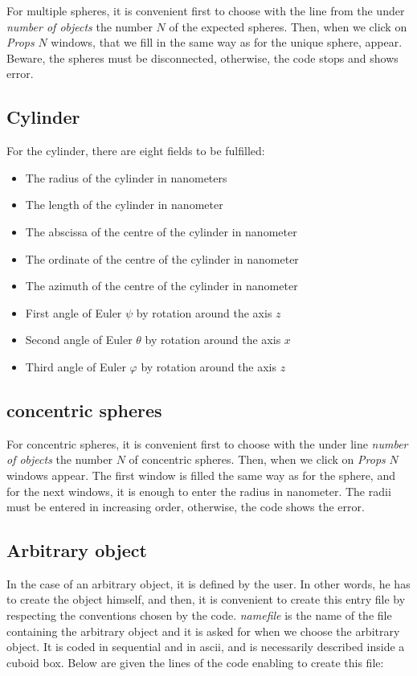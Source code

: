 For multiple spheres, it is convenient first to choose with the line 
from the under {\it number of objects} the number $N$ of the expected
spheres. Then, when we click on {\it Props} $N$ windows, that we fill 
in the same way as for the unique sphere, appear. 
Beware, the spheres must be disconnected, otherwise, the code stops 
and shows error. 

\subsection{Cylinder}

For the cylinder, there are eight fields to be fulfilled:

\begin{itemize}
\item The radius of the cylinder in nanometers
\item The length of the cylinder in nanometer
\item The abscissa of the centre of the cylinder in nanometer
\item The ordinate of the centre of the cylinder in nanometer
\item The azimuth of the centre of the cylinder in nanometer
\item First angle of Euler $\psi$ by rotation around the axis $z$
\item Second angle of Euler $\theta$ by rotation around the axis $x$
\item Third angle of Euler $\varphi$ by rotation around the axis $z$
\end{itemize}


\subsection{concentric spheres}

For concentric spheres, it is convenient first to choose with the
under line {\it number of objects} the number $N$ of concentric
spheres. Then, when we click on {\it Props} $N$ windows appear. The
first window is filled the same way as for the sphere, and for the
next windows, it is enough to enter the radius in nanometer.  The
radii must be entered in increasing order, otherwise, the code
shows the error.

\subsection{Arbitrary object}

In the case of an arbitrary object, it is defined by the user. In
other words, he has to create the object himself, and then, it is
convenient to create this entry file by respecting the conventions
chosen by the code. {\it namefile} is the name of the file containing
the arbitrary object and it is asked for when we choose the arbitrary
object. It is coded in sequential and in ascii, and is necessarily
described inside a cuboid box. Below are given the lines of
the code enabling to create this file:

